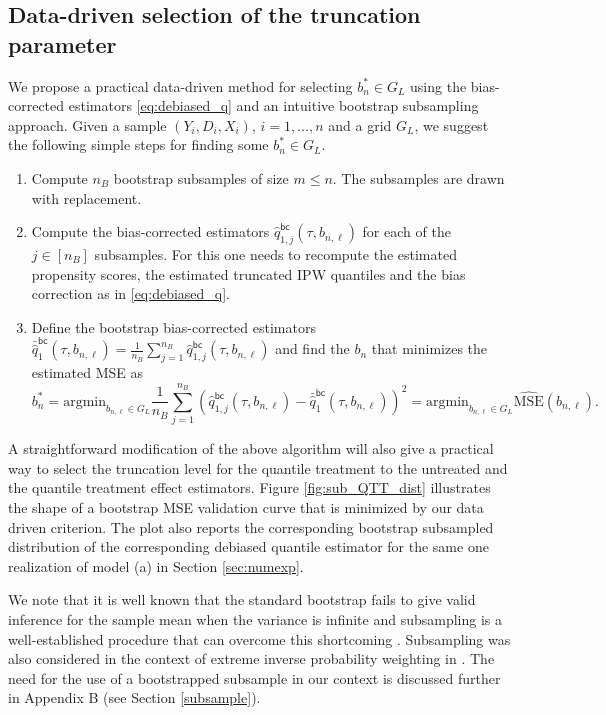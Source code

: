\documentclass[12pt]{amsart}
\newcommand{\1}{\mathbbm{1}}
\newcommand{\0}{\mathbf{0}}
\newcommand{\argmin}{\mathrm{argmin}}
\theoremstyle{plain}
\theoremstyle{definition}
\begin{document}
\subsection{Data-driven selection of the truncation parameter}
\label{sec:data_driven_selection}
%
We propose a practical data-driven method for selecting $b_n^*\in G_L$ using the  bias-corrected estimators \eqref{eq:debiased_q} and an intuitive bootstrap subsampling approach. Given a sample $(Y_i,D_i,X_i)$, $i=1,\dots,n$ and  a grid $G_L$, we suggest the following simple steps for finding some $b_n^*\in G_L$.
\begin{enumerate}
    \item Compute $n_B$ bootstrap subsamples of size $m\leq n$.   The subsamples are drawn with replacement.
    \item Compute the bias-corrected estimators $ \hat{q}_{1,j}^{\mathsf{bc}}(\tau,b_{n,\ell})$ for each of the $j\in [n_B]$ subsamples. For this one needs to recompute the estimated propensity scores, the estimated truncated IPW quantiles and the bias correction as in \eqref{eq:debiased_q}.
    \item Define the bootstrap bias-corrected estimators $\bar{\hat{q}}_{1}^{\mathsf{bc}}(\tau,b_{n,\ell})=\frac{1}{n_B}\sum_{j=1}^{n_B}\hat{q}_{1,j}^{\mathsf{bc}}(\tau,b_{n,\ell})$ and find the $b_n$ that minimizes the estimated MSE as
    \begin{equation*}
        b_n^*=\argmin_{b_{n,\ell}\in G_L}\frac{1}{n_B}\sum_{j=1}^{n_B}(\hat{q}_{1,j}^{\mathsf{bc}}(\tau,b_{n,\ell})-\bar{\hat{q}}_{1}^{\mathsf{bc}}(\tau,b_{n,\ell}))^2=\argmin_{b_{n,\ell}\in G_L}\widehat{\textrm{MSE}}(b_{n,\ell}).
    \end{equation*}
\end{enumerate}
%
A straightforward modification of the above algorithm will also give a practical way to select the truncation level for the quantile treatment to the untreated and the quantile treatment effect estimators. Figure \ref{fig:sub_QTT_dist} illustrates the shape of a bootstrap MSE validation curve that is minimized by our data driven criterion. The plot also reports the corresponding bootstrap subsampled distribution of the corresponding  debiased quantile estimator for the same one realization of model (a) in Section \ref{sec:numexp}.  

We note that it is well known that the standard bootstrap fails to give valid inference for the sample mean when the variance is infinite \citep{athreya1987,knight1989} and subsampling is a well-established procedure that can overcome this shortcoming \citep{arcones:gine1989,politis:romano1994,athreya:lahiri:wu1998,romano:wolf1999}. Subsampling was also considered in the context of extreme inverse probability weighting in \cite{ma:wang2020,heiler:kazak2021}.   The need for the use of a bootstrapped subsample in our context is discussed further in Appendix B (see Section \ref{subsample}).
\end{document}
